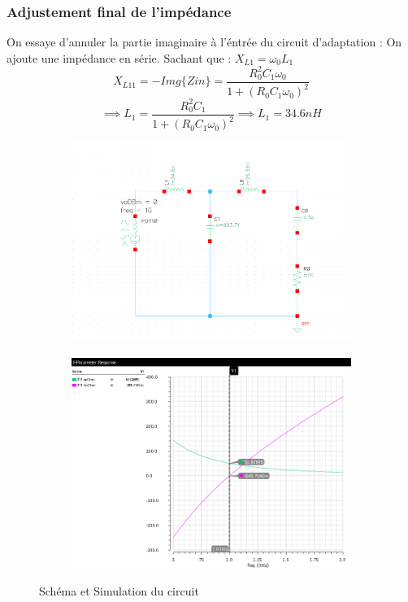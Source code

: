 \documentclass[a4paper]{article}
\begin{document}
\subsubsection{Adjustement final de l'imp\'edance}
On essaye d'annuler la partie imaginaire \`a l'\'entr\'ee du circuit d'adaptation : On ajoute une imp\'edance en s\'erie.
Sachant que : $X_{L1} = \omega_0 L_1$
\[
X_{L11} = - Img\{Zin\} = \frac{R^2_0 C_1 \omega_0} {1 + (R_0 C_1 \omega_0)^2}
\]
\[
\implies L_1 = \frac{R^2_0 C_1} {1 + (R_0 C_1 \omega_0)^2} \implies L_1 = 34.6 nH
\]
\begin{figure}[!htb]
  \centering
  \begin{subfigure}[t]{.4\linewidth}
      \centering
      \includegraphics[width=1\linewidth]{circuit-L1.png}
      \label{fig:L1circuit}
  \end{subfigure}%
  \begin{subfigure}[t]{.4\linewidth}
    \centering
    \includegraphics[width=1\linewidth]{circuit-L1-sim.png}
    \label{fig:L1circuit-sim}
  \end{subfigure}%
  \caption{Sch\'ema et Simulation du circuit}
  \label{fig:L1-sim}
\end{figure}
\end{document}
